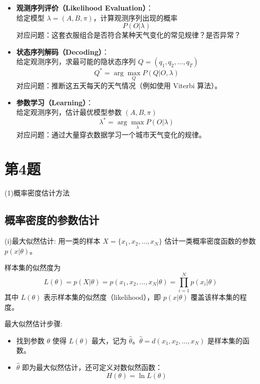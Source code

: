 \documentclass{article}
\begin{document}
\begin{itemize}
  \item \textbf{观测序列评价（Likelihood Evaluation）}：\\
    给定模型 $\lambda = (A, B, \pi)$，计算观测序列出现的概率
    \[
    P(O|\lambda)
    \]
    对应问题：这套衣服组合是否符合某种天气变化的常见规律？是否异常？

  \item \textbf{状态序列解码（Decoding）}：\\
    给定观测序列，求最可能的隐状态序列 $Q = (q_1, q_2, \dots, q_T)$
    \[
    Q^* = \arg\max_Q P(Q|O, \lambda)
    \]
    对应问题：推断这五天每天的天气情况（例如使用 Viterbi 算法）。

  \item \textbf{参数学习（Learning）}：\\
    给定观测序列，估计最优模型参数 $(A, B, \pi)$
    \[
    \lambda^* = \arg\max_\lambda P(O|\lambda)
    \]
    对应问题：通过大量穿衣数据学习一个城市天气变化的规律。
\end{itemize}

\section*{第4题}
(1)概率密度估计方法
\subsection*{概率密度的参数估计}

(i)最大似然估计:
用一类的样本 $X = \{x_1, x_2, \ldots, x_N\}$ 估计一类概率密度函数的参数 $p(x|\theta)$。

样本集的似然度为
\[
L(\theta) = p(X|\theta) = p(x_1, x_2, \ldots, x_N|\theta) = \prod_{i=1}^{N} p(x_i|\theta)
\]
其中 $L(\theta)$ 表示样本集的似然度（likelihood），即 $p(x|\theta)$ 覆盖该样本集的程度。

最大似然估计步骤:
\begin{itemize}
    \item 找到参数 $\theta$ 使得 $L(\theta)$ 最大，记为 $\hat{\theta}$。$\hat{\theta} = d(x_1, x_2, \ldots, x_N)$ 是样本集的函数。
    \item $\hat{\theta}$ 即为最大似然估计，还可定义对数似然函数：
    \[
    H(\theta) = \ln L(\theta)
    \]
\end{itemize}
\end{document}
